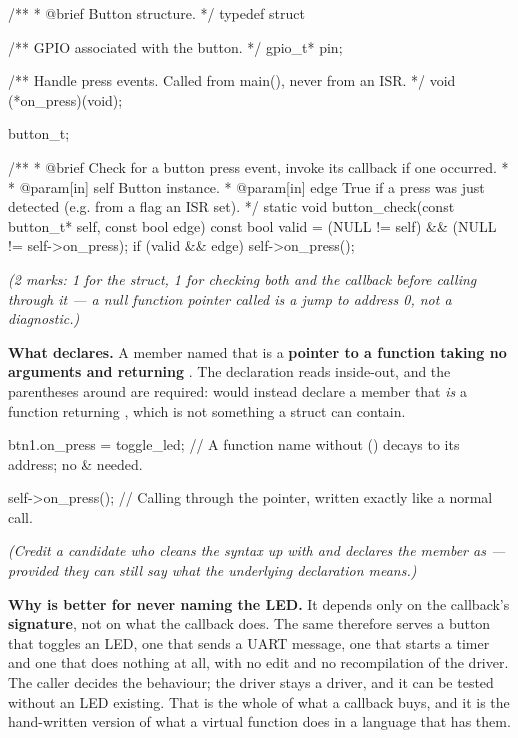 \begin{ccode}
/**
 * @brief Button structure.
 */
typedef struct
{
    /** GPIO associated with the button. */
    gpio_t* pin;

    /** Handle press events. Called from main(), never from an ISR. */
    void (*on_press)(void);
} button_t;

/**
 * @brief Check for a button press event, invoke its callback if one occurred.
 *
 * @param[in] self Button instance.
 * @param[in] edge True if a press was just detected (e.g. from a flag an ISR set).
 */
static void button_check(const button_t* self, const bool edge)
{
    const bool valid = (NULL != self) && (NULL != self->on_press);
    if (valid && edge) { self->on_press(); }
}
\end{ccode}

{\itshape (2 marks: 1 for the struct, 1 for  checking both  and the
callback before calling through it --- a null function pointer called is a jump to address 0, not a
diagnostic.)\par}

\medskip \textbf{What  declares.} A member named  that
is a \textbf{pointer to a function taking no arguments and returning }. The declaration
reads inside-out, and the parentheses around  are required:  would instead declare a member that \emph{is} a function returning ,
which is not something a struct can contain.

\begin{ccode}
btn1.on_press = toggle_led;   // A function name without () decays to its address; no & needed.
\end{ccode}

\begin{ccode}
self->on_press();             // Calling through the pointer, written exactly like a normal call.
\end{ccode}
\noindent{}

{\itshape (Credit a candidate who cleans the syntax up with\newline
{} and declares the member as
 --- provided they can still say what the underlying declaration
means.)\par}

\medskip \textbf{Why  is better for never naming the LED.} It depends only on
the callback's \textbf{signature}, not on what the callback does. The same 
therefore serves a button that toggles an LED, one that sends a UART message, one that starts a
timer and one that does nothing at all, with no edit and no recompilation of the driver. The caller
decides the behaviour; the driver stays a driver, and it can be tested without an LED existing. That
is the whole of what a callback buys, and it is the hand-written version of what a virtual function
does in a language that has them. 

